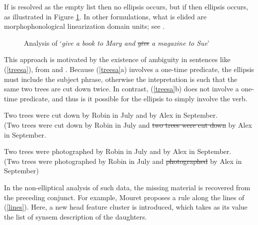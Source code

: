 \documentclass[output=paper]{langsci/langscibook}
\begin{document}
\noindent
If  is resolved as the empty list then no ellipsis occurs, but if  then ellipsis occurs, as illustrated in Figure \ref{lpe}. In other formulations, what is elided are morphophonological
linearization domain units; see \citet{chaveslp}.

\begin{figure}[ht]
    \centering
    

    \caption{Analysis of `{\it give a book to Mary and} \sout{\it give} {\it a magazine to Sue}'}\label{lpe}
\end{figure}

\noindent
This approach is motivated by the existence of ambiguity in 
sentences like (\ref{treesa}), from \citet{Beavers} and \citet{chaves06}. Because (\ref{treesa}a) involves a one-time predicate, the ellipsis must include the subject phrase, otherwise
the intepretation is such that the same two trees are cut down twice. In contrast,  (\ref{treesa}b) does not involve a one-time
predicate, and thus is it possible for the ellipsis to simply
involve the verb.


\begin{exe}
\ex 
\begin{xlista}
\ex Two trees were cut down by Robin in July and by Alex in September.\\
(Two trees were cut down by Robin in July and \sout{two trees were cut down} by Alex in September.

\ex Two trees were photographed by Robin in July and by Alex in September.\\
(Two trees were photographed by Robin in July and \sout{photographed} by Alex in September)
\end{xlista}\label{treesa}
\end{exe}



In the non-elliptical analysis of such data, the missing material is recovered from the preceding conjunct. For example, Mouret proposes a rule along the lines of (\ref{lines}).  Here, a new head feature {\sc cluster} is introduced, which  takes as its value the list of synsem 
description of the  daughters.
\end{document}
